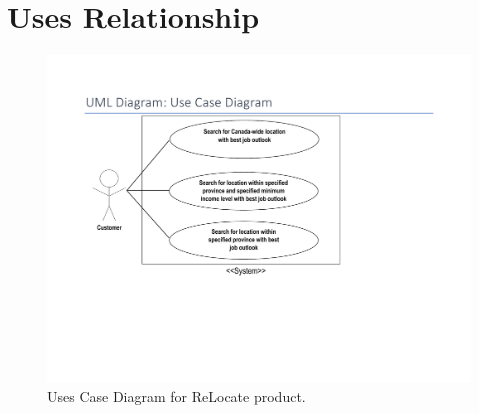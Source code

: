 \documentclass[12pt,fleqn]{article}
\begin{document}
\section*{Uses Relationship}
\begin{figure}[h]
  \includegraphics[width=\linewidth] {Group04_Uses_Diagram.pdf}
  \caption{Uses Case Diagram for ReLocate product.}
  \label{fig:uses}
\end{figure}





\newpage
\end{document}
